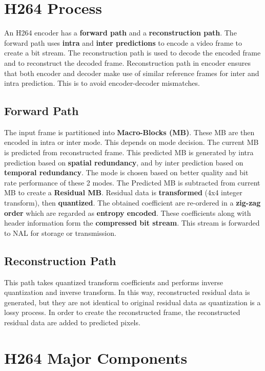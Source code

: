 \section{H264 Process}
An H264 encoder has a \textbf{forward path} and a \textbf{reconstruction path}. The forward path uses \textbf{intra} and \textbf{inter predictions} to encode a video frame to create a bit stream. The reconstruction path is used to decode the encoded frame and to reconstruct the decoded frame. Reconstruction path in encoder ensures that both encoder and decoder make use of similar reference frames for inter and intra prediction. This is to avoid encoder-decoder mismatches. 

\subsection{Forward Path}
The input frame is partitioned into \textbf{Macro-Blocks (MB)}. These MB are then encoded in intra or inter mode. This depends on mode decision. The current MB is predicted from reconstructed frame. This predicted MB is generated by intra prediction based on \textbf{spatial redundancy}, and by inter prediction based on \textbf{temporal redundancy}. The mode is chosen based on better quality and bit rate performance of these 2 modes. The Predicted MB is subtracted from current MB to create a \textbf{Residual MB}. Residual data is \textbf{transformed} (4x4 integer transform), then \textbf{quantized}. The obtained coefficient are re-ordered in a \textbf{zig-zag order} which are regarded as \textbf{entropy encoded}. These coefficients along with header information form the \textbf{compressed bit stream}. This stream is forwarded to NAL for storage or transmission. 

\subsection{Reconstruction Path}
This path takes quantized transform coefficients and performs inverse quantization and inverse transform. In this way, reconstructed residual data is generated, but they are not identical to original residual data as quantization is a lossy process. In order to create the reconstructed frame, the reconstructed residual data are added to predicted pixels. 

\section{H264 Major Components}

